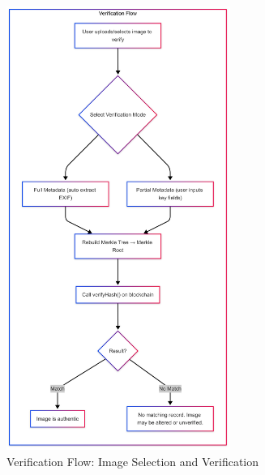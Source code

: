 \begin{figure}[ht!]
    \centering
    \includegraphics[width=0.65\textwidth]{images/verifyImageFlow.png}
    \caption{Verification Flow: Image Selection and Verification}
    \label{fig:verificationFlow}
\end{figure}

